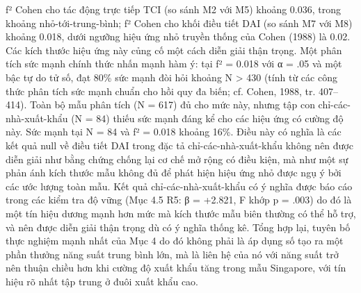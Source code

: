 \documentclass[12pt,a4paper]{article}
\begin{document}
f² Cohen cho tác động trực tiếp TCI (so sánh M2 với M5) khoảng 0.036,
trong khoảng nhỏ-tới-trung-bình; f² Cohen cho khối điều tiết DAI (so
sánh M7 với M8) khoảng 0.018, dưới ngưỡng hiệu ứng nhỏ truyền thống của
Cohen (1988) là 0.02. Các kích thước hiệu ứng này củng cố một cách diễn
giải thận trọng. Một phân tích sức mạnh chính thức nhấn mạnh hàm ý: tại
f² = 0.018 với α = .05 và một bậc tự do tử số, đạt 80\% sức mạnh đòi hỏi
khoảng N \textgreater{} 430 (tính từ các công thức phân tích sức mạnh
chuẩn cho hồi quy đa biến; cf. Cohen, 1988, tr. 407--414). Toàn bộ mẫu
phân tích (N = 617) đủ cho mức này, nhưng tập con chỉ-các-nhà-xuất-khẩu
(N = 84) thiếu sức mạnh đáng kể cho các hiệu ứng có cường độ này. Sức
mạnh tại N = 84 và f² = 0.018 khoảng 16\%. Điều này có nghĩa là các kết
quả null về điều tiết DAI trong đặc tả chỉ-các-nhà-xuất-khẩu không nên
được diễn giải như bằng chứng chống lại cơ chế mở rộng có điều kiện, mà
như một sự phản ánh kích thước mẫu không đủ để phát hiện hiệu ứng nhỏ
được ngụ ý bởi các ước lượng toàn mẫu. Kết quả chỉ-các-nhà-xuất-khẩu có
ý nghĩa được báo cáo trong các kiểm tra độ vững (Mục 4.5 R5: β = +2.821,
F khớp p = .003) do đó là một tín hiệu dương mạnh hơn mức mà kích thước
mẫu biên thường có thể hỗ trợ, và nên được diễn giải thận trọng dù có ý
nghĩa thống kê. Tổng hợp lại, tuyên bố thực nghiệm mạnh nhất của Mục 4
do đó không phải là áp dụng số tạo ra một phần thưởng năng suất trung
bình lớn, mà là liên hệ của nó với năng suất trở nên thuận chiều hơn khi
cường độ xuất khẩu tăng trong mẫu Singapore, với tín hiệu rõ nhất tập
trung ở đuôi xuất khẩu cao.
\end{document}
